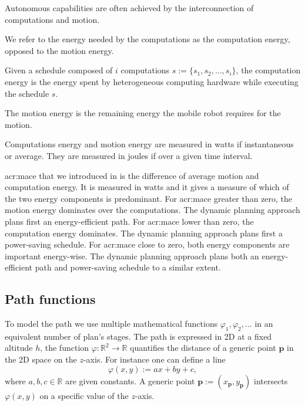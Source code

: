 Autonomous capabilities are often achieved by the interconnection of computations and motion.

We refer to the energy needed by the computations as the computation energy, opposed to the motion energy.

\begin{highlight}
\begin{defn}
  Given a schedule composed of $i$ computations $s:=\{s_1,s_2,\dots,s_i\}$, the computation energy is the energy spent by heterogeneous computing hardware while executing the schedule $s$.
  
  The motion energy is the remaining energy the mobile robot requires for the motion.
\end{defn}
\end{highlight}

Computations energy and motion energy are measured in watts if instantaneous or average. They are measured in joules if over a given time interval.

\Gls{acr:mace} that we introduced in  is the difference of average motion and computation energy. It is measured in watts and it gives a measure of which of the two energy components is predominant. For \Gls{acr:mace} greater than zero, the motion energy dominates over the computations. The dynamic planning approach plans first an energy-efficient path. For \Gls{acr:mace} lower than zero, the computation energy dominates. The dynamic planning approach plans first a power-saving schedule. For \Gls{acr:mace} close to zero, both energy components are important energy-wise. The dynamic planning approach plans both an energy-efficient path and power-saving schedule to a similar extent.

\subsection{Path functions}

To model the path we use multiple mathematical functions $\varphi_1,\varphi_2,\dots$ in an equivalent number of plan's stages. The path is expressed in 2D at a fixed altitude $h$, the function $\varphi:\mathbb{R}^2\rightarrow\mathbb{R}$ quantifies the distance of a generic point $\mathbf{p}$ in the 2D space on the $z$-axis. For instance one can define a line
\begin{equation}\label{eq:basic-path}
  \varphi(x,y):=ax+by+c,
\end{equation}
where $a,b,c\in\mathbb{R}$ are given constants. A generic point $\mathbf{p}:=(x_{\mathbf{p}},y_{\mathbf{p}})$ intersects $\varphi(x,y)$ on a specific value of the $z$-axis.


